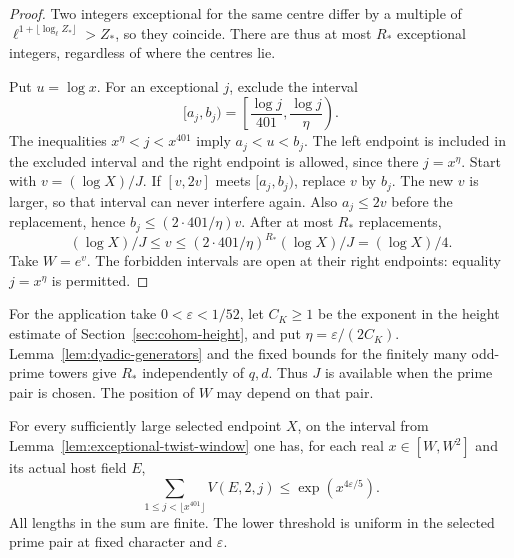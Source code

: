 \begin{proof}
Two integers exceptional for the same centre differ by a multiple of
\(\ell^{1+\lfloor\log_\ell Z_*\rfloor}>Z_*\), so they coincide.
There are thus at most \(R_*\) exceptional integers, regardless of
where the centres lie.

Put \(u=\log x\). For an exceptional \(j\), exclude the interval
\[
 [a_j,b_j)=\left[\frac{\log j}{401},\frac{\log j}{\eta}\right).
\]
The inequalities \(x^\eta<j<x^{401}\) imply
\(a_j<u<b_j\). The left endpoint is included in the excluded
interval and the right endpoint is allowed, since there
\(j=x^\eta\). Start with
\(v=(\log X)/J\). If \([v,2v]\) meets \([a_j,b_j)\), replace \(v\)
by \(b_j\). The new \(v\) is larger, so that interval can never
interfere again. Also \(a_j\le 2v\) before the replacement, hence
\(b_j\le(2\cdot401/\eta)v\). After at most \(R_*\) replacements,
\[
 (\log X)/J\le v\le (2\cdot401/\eta)^{R_*}(\log X)/J
                   =(\log X)/4 .
\]
Take \(W=e^v\). The forbidden intervals are open at their right
endpoints: equality \(j=x^\eta\) is permitted.
\end{proof}

For the application take \(0<\varepsilon<1/52\), let
\(C_K\ge1\) be the exponent in the height estimate of
Section~\ref{sec:cohom-height}, and put \(\eta=\varepsilon/(2C_K)\).
Lemma~\ref{lem:dyadic-generators} and the fixed bounds for the
finitely many odd-prime towers give \(R_*\) independently of \(q,d\).
Thus \(J\) is available when the prime pair is chosen. The position
of \(W\) may depend on that pair.

\begin{proposition}\label{prop:dyadic-window-total}
For every sufficiently large selected endpoint \(X\), on the
interval from Lemma~\ref{lem:exceptional-twist-window} one has,
for each real \(x\in[W,W^2]\) and its actual host field \(E\),
\[
  \sum_{1\le j<\lfloor x^{401}\rfloor} V(E,2,j)
                  \le \exp(x^{4\varepsilon/5}).
\]
All lengths in the sum are finite. The lower threshold is uniform in
the selected prime pair at fixed character and \(\varepsilon\).
\end{proposition}

